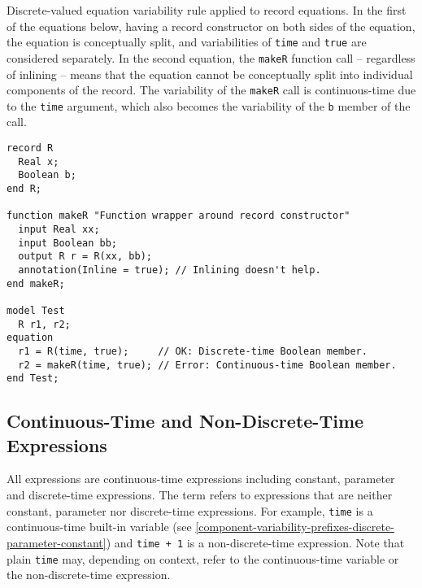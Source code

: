 \begin{example}
Discrete-valued equation variability rule applied to record equations.
In the first of the equations below, having a record constructor on both sides of the equation, the equation is conceptually split, and variabilities of \lstinline!time! and \lstinline!true! are considered separately.
In the second equation, the \lstinline!makeR! function call -- regardless of inlining -- means that the equation cannot be conceptually split into individual components of the record.
The variability of the \lstinline!makeR! call is continuous-time due to the \lstinline!time! argument, which also becomes the variability of the \lstinline!b! member of the call.
\begin{lstlisting}[language=modelica]
record R
  Real x;
  Boolean b;
end R;

function makeR "Function wrapper around record constructor"
  input Real xx;
  input Boolean bb;
  output R r = R(xx, bb);
  annotation(Inline = true); // Inlining doesn't help.
end makeR;

model Test
  R r1, r2;
equation
  r1 = R(time, true);     // OK: Discrete-time Boolean member.
  r2 = makeR(time, true); // Error: Continuous-time Boolean member.
end Test;
\end{lstlisting}
\end{example}

\subsection{Continuous-Time and Non-Discrete-Time Expressions}\label{continuous-time-expressions}

All expressions are continuous-time expressions including constant, parameter and discrete-time expressions.
The term  refers to expressions that are neither constant, parameter nor discrete-time expressions.
For example, \lstinline!time! is a continuous-time built-in variable (see \cref{component-variability-prefixes-discrete-parameter-constant}) and \lstinline!time + 1! is a non-discrete-time expression.
Note that plain \lstinline!time! may, depending on context, refer to the continuous-time variable or the non-discrete-time expression.
